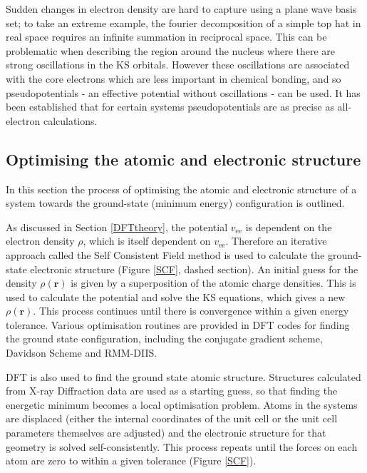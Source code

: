 Sudden changes in electron density are hard to capture using a plane wave basis set; to take an extreme example, the fourier decomposition of a simple top hat in real space requires an infinite summation in reciprocal space. This can be problematic when describing the region around the nucleus where there are strong oscillations in the KS orbitals. However these oscillations are associated with the core electrons which are less important in chemical bonding, and so pseudopotentials - an effective potential without oscillations - can be used. It has been established that for certain systems pseudopotentials are as precise as all-electron calculations.\autocite{Lejaeghere2016}

\subsection{Optimising the atomic and electronic structure}

In this section the process of optimising the atomic and electronic structure of a system towards the ground-state (minimum energy) configuration is outlined. 

As discussed in Section \ref{DFTtheory}, the potential $v_\textrm{ee}$ is dependent on the electron density $\rho$, which is itself dependent on $v_\textrm{ee}$. Therefore an iterative approach called the Self Consistent Field method is used to calculate the ground-state electronic structure (Figure \ref{SCF}, dashed section). An initial guess for the density $\rho(\textbf{r})$ is given by a superposition of the atomic charge densities. This is used to calculate the potential and solve the KS equations, which gives a new $\rho(\textbf{r})$. This process continues until there is convergence within a given energy tolerance. Various optimisation routines are provided in DFT codes for finding the ground state configuration, including the conjugate gradient scheme, Davidson Scheme and RMM-DIIS.

DFT is also used to find the ground state atomic structure. Structures calculated from X-ray Diffraction data are used as a starting guess, so that finding the energetic minimum becomes a local optimisation problem. Atoms in the systems are displaced (either the internal coordinates of the unit cell or the unit cell parameters themselves are adjusted) and the electronic structure for that geometry is solved self-consistently. This process repeats until the forces on each atom are zero to within a given tolerance (Figure \ref{SCF}). 

